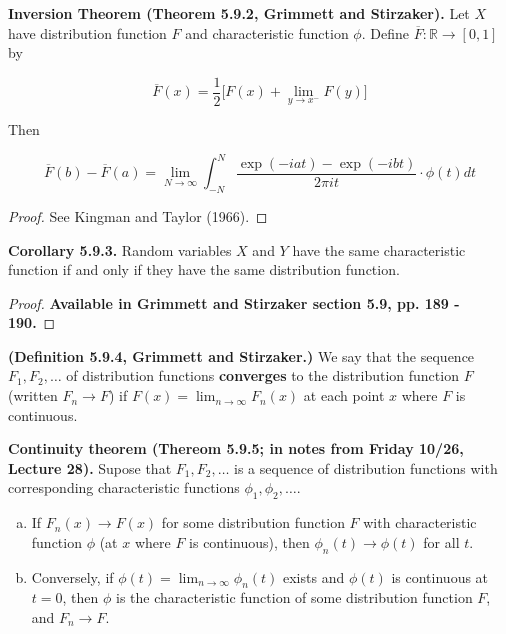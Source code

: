 \begin{theorem} \textbf{Inversion Theorem (Theorem 5.9.2, Grimmett and Stirzaker).} Let \(X\) have distribution function \(F\) and characteristic function \(\phi\). Define \(\overline{F}: \mathbb{R} \to [0, 1]\) by

\[
\overline{F}(x) = \frac{1}{2} \big[ F(x) + \lim_{y \to x^-} F(y) \big]
\]

Then

\[
\overline{F}(b) - \overline{F}(a) = \lim_{N \to \infty} \int_{-N}^N \frac{\exp(-iat) - \exp(-ibt)}{2\pi i t} \cdot \phi(t) dt
\]

\end{theorem}

\begin{proof} See Kingman and Taylor (1966). \end{proof}

\begin{corollary} \textbf{Corollary 5.9.3.} Random variables \(X\) and \(Y\) have the same characteristic function if and only if they have the same distribution function.
\end{corollary}

\begin{proof} \textbf{Available in Grimmett and Stirzaker section 5.9, pp. 189 - 190.} \end{proof}

\begin{definition} \textbf{(Definition 5.9.4, Grimmett and Stirzaker.)} We say that the sequence \(F_1, F_2, \ldots\) of distribution functions \textbf{converges} to the distribution function \(F\) (written \(F_n \to F\)) if \(F(x) = \lim_{n\to \infty} F_n(x)\) at each point \(x\) where \(F\) is continuous.
\end{definition}

\begin{theorem}
\textbf{Continuity theorem (Thereom 5.9.5; in notes from Friday 10/26, Lecture 28).} Supose that \(F_1, F_2, \ldots\) is a sequence of distribution functions with corresponding characteristic functions \(\phi_1, \phi_2, \ldots\). 

\begin{enumerate}[(a)]

\item If \(F_n(x) \to F(x)\) for some distribution function \(F\) with characteristic function \(\phi\) (at \(x\) where \(F\) is continuous), then \(\phi_n(t) \to \phi(t)\) for all \(t\).

\item Conversely, if \(\phi(t) = \lim_{n \to \infty} \phi_n(t)\) exists and \(\phi(t)\) is continuous at \(t = 0\), then \(\phi\) is the characteristic function of some distribution function \(F\), and \(F_n \to F\). 

\end{enumerate}
\end{theorem}

